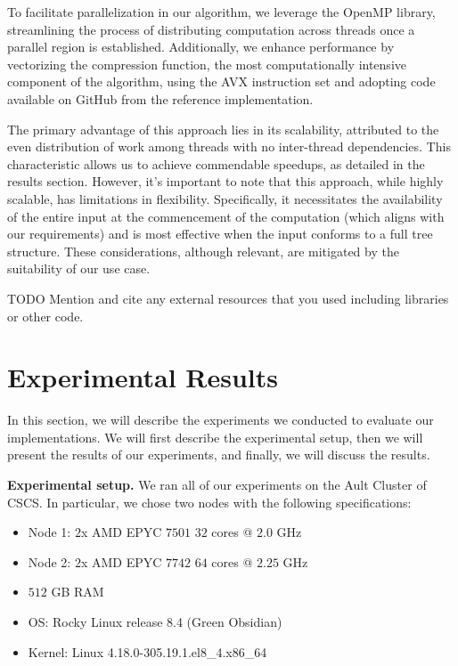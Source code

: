 \documentclass[letterpaper]{article}
\newcommand{\mypar}[1]{{\bf #1.}}
\begin{document}
To facilitate parallelization in our algorithm, we leverage the OpenMP library, streamlining the process of distributing computation across threads once a parallel region is established. Additionally, we enhance performance by vectorizing the compression function, the most computationally intensive component of the algorithm, using the AVX instruction set and adopting code available on GitHub from the reference implementation.

The primary advantage of this approach lies in its scalability, attributed to the even distribution of work among threads with no inter-thread dependencies. This characteristic allows us to achieve commendable speedups, as detailed in the results section. However, it's important to note that this approach, while highly scalable, has limitations in flexibility. Specifically, it necessitates the availability of the entire input at the commencement of the computation (which aligns with our requirements) and is most effective when the input conforms to a full tree structure. These considerations, although relevant, are mitigated by the suitability of our use case.

TODO Mention and cite any external resources that you used including libraries or other code.

\section{Experimental Results}\label{sec:exp}


In this section, we will describe the experiments we conducted to evaluate our implementations.
We will first describe the experimental setup, then we will present the results of our experiments, and finally, we will discuss the results.

\mypar{Experimental setup}
We ran all of our experiments on the Ault Cluster of CSCS. In particular, we chose two nodes with the following specifications:
\begin{itemize}
  \item Node 1: $2$x AMD EPYC $7501$ $32$ cores @ $2.0$ GHz
  \item Node 2: $2$x AMD EPYC $7742$ $64$ cores @ $2.25$ GHz
  \item $512$ GB RAM
  \item OS: Rocky Linux release 8.4 (Green Obsidian)
  \item Kernel: Linux 4.18.0-305.19.1.el8\_4.x86\_64
\end{itemize}
\end{document}
